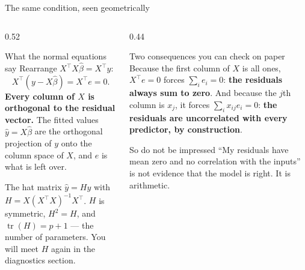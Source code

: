\documentclass[aspectratio=169]{beamer}
\newcommand{\Xt}{X^{\!\top}}
\begin{document}
\begin{frame}[shrink=6]{The same condition, seen geometrically}
  \begin{columns}[T]
    \begin{column}{0.52\textwidth}
      \begin{block}{What the normal equations say}
        Rearrange $\Xt X\hat\beta = \Xt y$:
        \[ \Xt(y - X\hat\beta) = \Xt e = 0 . \]
        \textbf{Every column of $X$ is orthogonal to the residual vector.}
        The fitted values $\hat y = X\hat\beta$ are the orthogonal projection
        of $y$ onto the column space of $X$, and $e$ is what is left over.
      \end{block}
      \begin{block}{The hat matrix}
        \small $\hat y = Hy$ with $H = X(\Xt X)^{-1}\Xt$. $H$ is symmetric,
        $H^2 = H$, and $\operatorname{tr}(H) = p+1$ --- the number of
        parameters. You will meet $H$ again in the diagnostics section.
      \end{block}
    \end{column}
    \begin{column}{0.44\textwidth}
      \begin{exampleblock}{Two consequences you can check on paper}
        \small Because the first column of $X$ is all ones,
        $\Xt e = 0$ forces $\sum_i e_i = 0$: \textbf{the residuals always sum
        to zero}. And because the $j$th column is $x_j$, it forces
        $\sum_i x_{ij}e_i = 0$: \textbf{the residuals are uncorrelated with
        every predictor, by construction}.
      \end{exampleblock}
      \begin{alertblock}{So do not be impressed}
        \small ``My residuals have mean zero and no correlation with the
        inputs'' is not evidence that the model is right. It is arithmetic.
      \end{alertblock}
    \end{column}
  \end{columns}
\end{frame}
\end{document}
